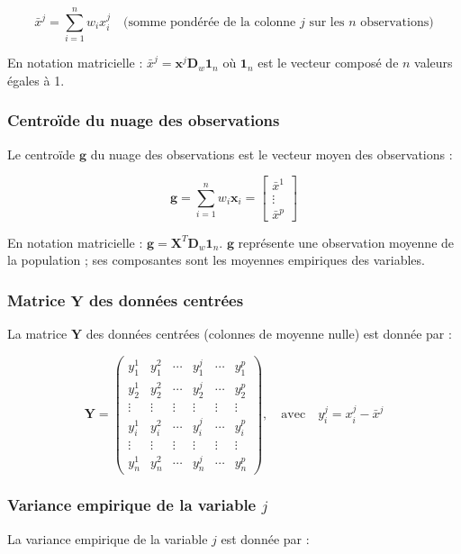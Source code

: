 \documentclass[10pt,a4paper]{article}
\begin{document}
\[
\bar{x}^j = \sum_{i=1}^n w_i x_i^j \quad \text{(somme pondérée de la colonne $j$ sur les $n$ observations)}
\]

En notation matricielle : $\bar{x}^j = \mathbf{x}^j \mathbf{D}_w \mathbf{1}_n$ où $\mathbf{1}_n$ est le vecteur composé de $n$ valeurs égales à 1.

\subsubsection*{Centroïde du nuage des observations}
Le centroïde $\mathbf{g}$ du nuage des observations est le vecteur moyen des observations :

\[
\mathbf{g} = \sum_{i=1}^n w_i \mathbf{x}_i = \begin{bmatrix}
\bar{x}^1 \\
\vdots \\
\bar{x}^p
\end{bmatrix}
\]

En notation matricielle : $\mathbf{g} = \mathbf{X}^T \mathbf{D}_w \mathbf{1}_n$. $\mathbf{g}$ représente une observation moyenne de la population ; ses composantes sont les moyennes empiriques des variables.

\subsubsection*{Matrice $\mathbf{Y}$ des données centrées}
La matrice $\mathbf{Y}$ des données centrées (colonnes de moyenne nulle) est donnée par :

\[
\mathbf{Y} = \begin{pmatrix}
y_1^1 & y_1^2 & \cdots & y_1^j & \cdots & y_1^p \\
y_2^1 & y_2^2 & \cdots & y_2^j & \cdots & y_2^p \\
\vdots & \vdots & \vdots & \vdots & \vdots & \vdots \\
y_i^1 & y_i^2 & \cdots & y_i^j & \cdots & y_i^p \\
\vdots & \vdots & \vdots & \vdots & \vdots & \vdots \\
y_n^1 & y_n^2 & \cdots & y_n^j & \cdots & y_n^p
\end{pmatrix}, \quad \text{avec} \quad y_i^j = x_i^j - \bar{x}^j
\]

\subsubsection*{Variance empirique de la variable $j$}
La variance empirique de la variable $j$ est donnée par :
\end{document}
